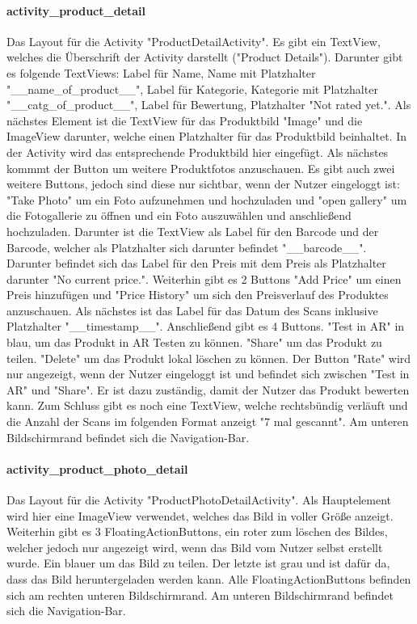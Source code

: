 \documentclass{scrartcl}
\begin{document}
\paragraph{activity\_product\_detail} \mbox{} 

\noindent Das Layout für die Activity "ProductDetailActivity". Es gibt ein TextView, welches die Überschrift der Activity darstellt ("Product Details"). Darunter gibt es folgende TextViews: Label für Name, Name mit Platzhalter "\_\_name\_of\_product\_\_", Label für Kategorie, Kategorie mit Platzhalter "\_\_catg\_of\_product\_\_", Label für Bewertung, Platzhalter "Not rated yet.". Als nächstes Element ist die TextView für das Produktbild "Image" und die ImageView darunter, welche einen Platzhalter für das Produktbild beinhaltet. In der Activity wird das entsprechende Produktbild hier eingefügt. Als nächstes kommmt der Button um weitere Produktfotos anzuschauen. Es gibt auch zwei weitere Buttons, jedoch sind diese nur sichtbar, wenn der Nutzer eingeloggt ist: "Take Photo" um ein Foto aufzunehmen und hochzuladen und "open gallery" um die Fotogallerie zu öffnen und ein Foto auszuwählen und anschließend hochzuladen. Darunter ist die TextView als Label für den Barcode und der Barcode, welcher als Platzhalter sich darunter befindet "\_\_barcode\_\_". Darunter befindet sich das Label für den Preis mit dem Preis als Platzhalter darunter "No current price.". Weiterhin gibt es 2 Buttons "Add Price" um einen Preis hinzufügen und "Price History" um sich den Preisverlauf des Produktes anzuschauen. Als nächstes ist das Label für das Datum des Scans inklusive Platzhalter "\_\_timestamp\_\_". Anschließend gibt es 4 Buttons. "Test in AR" in blau, um das Produkt in AR Testen zu können. "Share" um das Produkt zu teilen. "Delete" um das Produkt lokal löschen zu können. Der Button "Rate" wird nur angezeigt, wenn der Nutzer eingeloggt ist und befindet sich zwischen "Test in AR" und "Share". Er ist dazu zuständig, damit der Nutzer das Produkt bewerten kann. Zum Schluss gibt es noch eine TextView, welche rechtsbündig verläuft und die Anzahl der Scans im folgenden Format anzeigt "7 mal gescannt". Am unteren Bildschirmrand befindet sich die Navigation-Bar.

\paragraph{activity\_product\_photo\_detail} \mbox{} 

\noindent Das Layout für die Activity "ProductPhotoDetailActivity". Als Hauptelement wird hier eine ImageView verwendet, welches das Bild in voller Größe anzeigt. Weiterhin gibt es 3 FloatingActionButtons, ein roter zum löschen des Bildes, welcher jedoch nur angezeigt wird, wenn das Bild vom Nutzer selbst erstellt wurde. Ein blauer um das Bild zu teilen. Der letzte ist grau und ist dafür da, dass das Bild heruntergeladen werden kann. Alle FloatingActionButtons befinden sich am rechten unteren Bildschirmrand. Am unteren Bildschirmrand befindet sich die Navigation-Bar.
\end{document}

